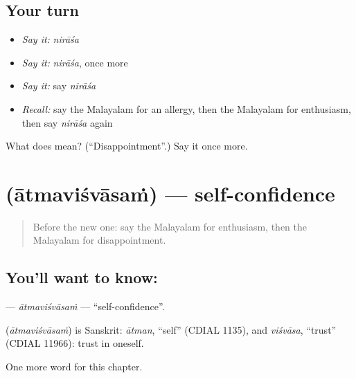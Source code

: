 \subsection*{Your turn}
\begin{itemize}
\raggedright
  \item \emph{Say it:} \emph{nirāśa}
  \item \emph{Say it:} \emph{nirāśa}, once more
  \item \emph{Say it:} say \emph{nirāśa}
  \item \emph{Recall:} say the Malayalam for an allergy, then the Malayalam for enthusiasm, then say \emph{nirāśa} again
\end{itemize}

\begin{tcolorbox}[breakable,colback=teal!4,colframe=teal!35!black,title={Before you move on}]
What does  mean? (\textquotedblleft{}Disappointment\textquotedblright{}.) Say it once more.
\end{tcolorbox}
\section[\texorpdfstring{\ml{ആത്മവിശ്വാസം} (ātmaviśvāsaṁ)}{ആത്മവിശ്വാസം (ātmaviśvāsaṁ)}]{ (ātmaviśvāsaṁ) — self-confidence}

\label{lesson:ML-C234-atmavisvasam}



\begin{quote}
Before the new one: say the Malayalam for enthusiasm, then the Malayalam for disappointment.
\end{quote}

\subsection*{You'll want to know: }
\textbf{} — \emph{ātmaviśvāsaṁ} — \textquotedblleft{}self-confidence\textquotedblright{}.

\begin{cousinweb}
\textbf{} (\emph{ātmaviśvāsaṁ}) is Sanskrit: \emph{ātman}, \textquotedblleft{}self\textquotedblright{} (CDIAL 1135), and \emph{viśvāsa}, \textquotedblleft{}trust\textquotedblright{} (CDIAL 11966): trust in oneself.
\end{cousinweb}

\begin{grammarlens}[title={What you've built}]
One more word for this chapter.
\end{grammarlens}

